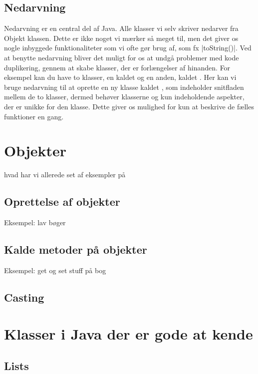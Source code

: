\subsection{Nedarvning}

Nedarvning er en central del af Java. Alle klasser vi selv skriver nedarver fra Objekt klassen. Dette er ikke noget vi mærker så meget til, men det giver os nogle inbyggede funktionaliteter som vi ofte gør brug af, som fx \JavaInline|toString()|. Ved at benytte nedarvning bliver det muligt for os at undgå problemer med kode duplikering, gennem at skabe klasser, der er forlængelser af hinanden. For eksempel kan du have to klasser, en kaldet  og en anden, kaldet . Her kan vi bruge nedarvning til at oprette en ny klasse kaldet , som indeholder snitfladen mellem de to klasser, dermed behøver klasserne  og  kun indeholdende aspekter, der er unikke for den klasse. Dette giver os mulighed for kun at beskrive de fælles funktioner en gang. 

\section{Objekter}

hvad har vi allerede set af eksempler på

\subsection{Oprettelse af objekter}

Eksempel: lav bøger

\subsection{Kalde metoder på objekter}

Eksempel: get og set stuff på bog

\subsection{Casting}

\section{Klasser i Java der er gode at kende}

\subsection{Lists}


